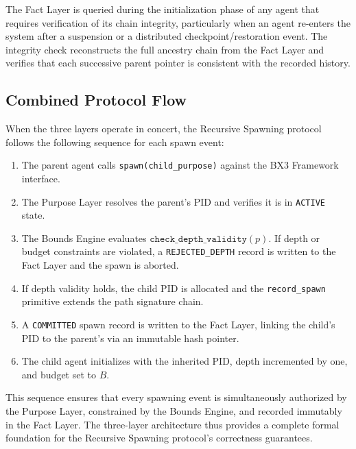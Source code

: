 The Fact Layer is queried during the initialization phase of any agent
that requires verification of its chain integrity, particularly when
an agent re-enters the system after a suspension or a distributed
checkpoint/restoration event. The integrity check reconstructs the full
ancestry chain from the Fact Layer and verifies that each successive
parent pointer is consistent with the recorded history.

\subsection{Combined Protocol Flow}
\label{sec:combined-flow}

When the three layers operate in concert, the Recursive Spawning
protocol follows the following sequence for each spawn event:

\begin{enumerate}
  \item The parent agent calls \texttt{spawn(child\_purpose)} against
        the BX3 Framework interface.
  \item The Purpose Layer resolves the parent's PID and verifies it is in
        \texttt{ACTIVE} state.
  \item The Bounds Engine evaluates $\texttt{check\_depth\_validity}(p)$.
        If depth or budget constraints are violated, a
        \texttt{REJECTED\_DEPTH} record is written to the Fact Layer and
        the spawn is aborted.
  \item If depth validity holds, the child PID is allocated and the
        \texttt{record\_spawn} primitive extends the path signature chain.
  \item A \texttt{COMMITTED} spawn record is written to the Fact Layer,
        linking the child's PID to the parent's via an immutable hash
        pointer.
  \item The child agent initializes with the inherited PID, depth
        incremented by one, and budget set to $B$.
\end{enumerate}

This sequence ensures that every spawning event is simultaneously
authorized by the Purpose Layer, constrained by the Bounds Engine, and
recorded immutably in the Fact Layer. The three-layer architecture thus
provides a complete formal foundation for the Recursive Spawning
protocol's correctness guarantees.

